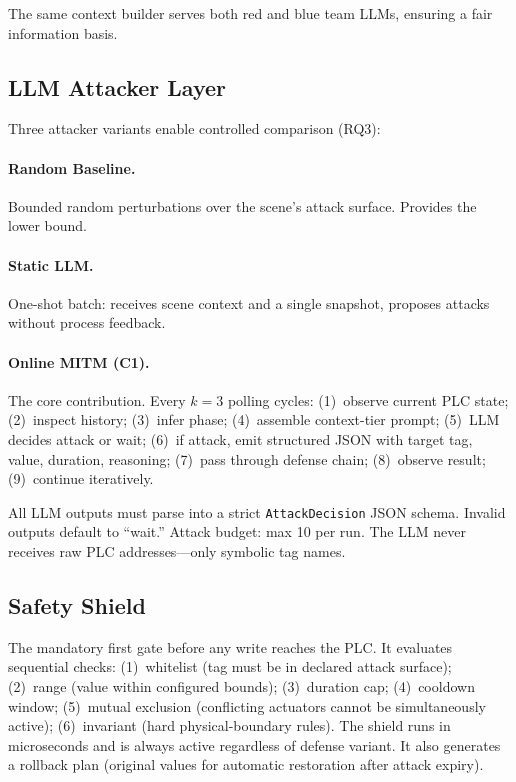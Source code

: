 The same context builder serves both red and blue team LLMs, ensuring a fair information basis.

\subsection{LLM Attacker Layer}
\label{sec:design:attacker}

Three attacker variants enable controlled comparison (RQ3):

\paragraph{Random Baseline.} Bounded random perturbations over the scene's attack surface. Provides the lower bound.

\paragraph{Static LLM.} One-shot batch: receives scene context and a single snapshot, proposes attacks without process feedback.

\paragraph{Online MITM (C1).} The core contribution. Every $k{=}3$ polling cycles: (1)~observe current PLC state; (2)~inspect history; (3)~infer phase; (4)~assemble context-tier prompt; (5)~LLM decides attack or wait; (6)~if attack, emit structured JSON with target tag, value, duration, reasoning; (7)~pass through defense chain; (8)~observe result; (9)~continue iteratively.

All LLM outputs must parse into a strict \texttt{AttackDecision} JSON schema. Invalid outputs default to ``wait.'' Attack budget: max 10 per run. The LLM never receives raw PLC addresses---only symbolic tag names.

\subsection{Safety Shield}
\label{sec:design:shield}

The mandatory first gate before any write reaches the PLC. It evaluates sequential checks: (1)~whitelist (tag must be in declared attack surface); (2)~range (value within configured bounds); (3)~duration cap; (4)~cooldown window; (5)~mutual exclusion (conflicting actuators cannot be simultaneously active); (6)~invariant (hard physical-boundary rules). The shield runs in microseconds and is always active regardless of defense variant. It also generates a rollback plan (original values for automatic restoration after attack expiry).

